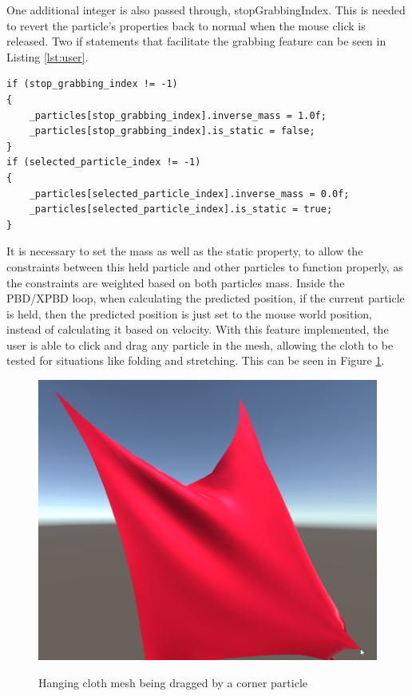 \documentclass[12pt,a4paper]{article}
\begin{document}
One additional integer is also passed through, stopGrabbingIndex. This is needed to revert the particle's properties back to normal when the mouse click is released. Two if statements that facilitate the grabbing feature can be seen in Listing \ref{lst:user}.
\begin{lstlisting}[caption={Modifying particles from user interaction},label={lst:user}]
if (stop_grabbing_index != -1)
{
	_particles[stop_grabbing_index].inverse_mass = 1.0f;
	_particles[stop_grabbing_index].is_static = false;
}
if (selected_particle_index != -1)
{
	_particles[selected_particle_index].inverse_mass = 0.0f;
	_particles[selected_particle_index].is_static = true;
}	
\end{lstlisting}
It is necessary to set the mass as well as the static property, to allow the constraints between this held particle and other particles to function properly, as the constraints are weighted based on both particles mass. Inside the PBD/XPBD loop, when calculating the predicted position, if the current particle is held, then the predicted position is just set to the mouse world position, instead of calculating it based on velocity. With this feature implemented, the user is able to click and drag any particle in the mesh, allowing the cloth to be tested for situations like folding and stretching. This can be seen in Figure \ref{fig:drag}.
\begin{figure}
	\centering
	\caption{Hanging cloth mesh being dragged by a corner particle}
	\includegraphics[scale=0.5]{drag.png}
	\label{fig:drag}
\end{figure}
\end{document}
